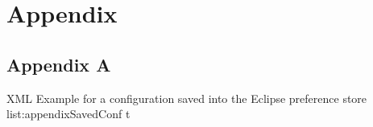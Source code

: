 \chapter{Appendix}
\section{Appendix A}
\label{section:AppendixSavedConf}
\listingxml
{}
{XML}
{Example for a configuration saved into the Eclipse preference store}
{list:appendixSavedConf}
{t}